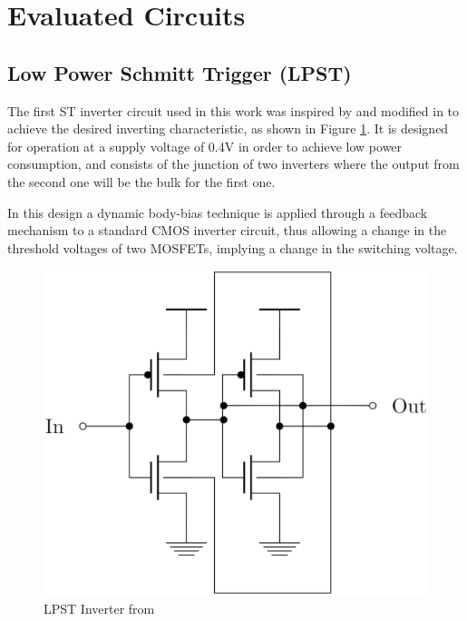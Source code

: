 \documentclass[pgmicro,mestrado,english]{iiufrgs}
\begin{document}
\section{Evaluated Circuits}

\subsection{Low Power Schmitt Trigger (LPST)}
The first ST inverter circuit used in this work was inspired by \cite{zhang2003low} and modified in \cite{dokania2015circuit} to achieve the desired inverting characteristic, as shown in Figure \ref{fig:LPST}. It is designed for operation at a supply voltage of 0.4V in order to achieve low power consumption, and consists of the junction of two inverters where the output from the second one will be the bulk for the first one.

In this design a dynamic body-bias technique is applied through a feedback mechanism to a standard CMOS inverter circuit, thus allowing a change in the threshold voltages of two MOSFETs, implying a change in the switching voltage.

\begin{figure}[]
  \centering
  \includegraphics[width=.5\linewidth]{STOriginal.eps}
  \caption{LPST Inverter from \citet{dokania2015circuit}}
  \label{fig:LPST}
\end{figure}
\end{document}
